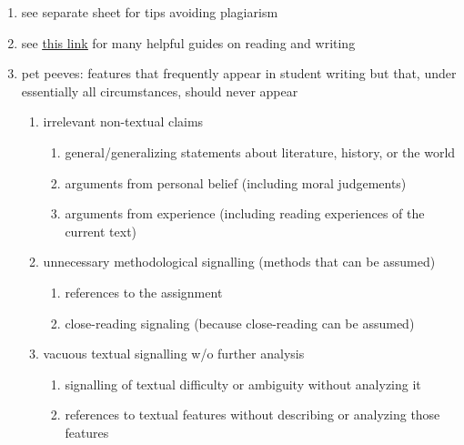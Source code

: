 \documentclass[12pt]{article}
\begin{document}
\begin{enumerate}
\begin{enumerate}
    \item doesn’t merely summarize the preceding: shows what the paper/results imply and the import therein and details what further research is required
    \end{enumerate}
\item see separate sheet for tips avoiding plagiarism
\item see \href{http://depts.washington.edu/owrc/handouts}{\underline{this link}} for many helpful guides on reading and writing
\item pet peeves: features that frequently appear in student writing but that, under essentially all circumstances, should never appear
    \begin{enumerate}
    \item irrelevant non-textual claims
        \begin{enumerate}
        \item general/generalizing statements about literature, history, or the world
        \item arguments from personal belief (including moral judgements)
        \item arguments from experience (including reading experiences of the current text)
        \end{enumerate}
    \item unnecessary methodological signalling (methods that can be assumed)
        \begin{enumerate}
        \item references to the assignment
        \item close-reading signaling (because close-reading can be assumed)
        \end{enumerate}
    \item vacuous textual signalling w/o further analysis
        \begin{enumerate}
        \item signalling of textual difficulty or ambiguity without analyzing it
        \item references to textual features without describing or analyzing those features
        \end{enumerate}
    \end{enumerate}
\end{enumerate}
\end{document}
